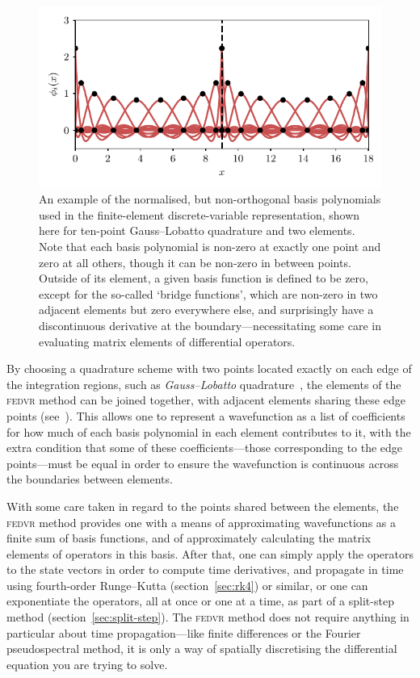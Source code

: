 \begin{figure}[t]
    \centerfloat
    \includegraphics{figures/numerics/fedvr_basis.pdf}
    \caption{An example of the normalised, but non-orthogonal basis polynomials used in the finite-element discrete-variable representation, shown here for ten-point Gauss--Lobatto quadrature and two elements. Note that each basis polynomial is non-zero at exactly one point and zero at all others, though it can be non-zero in between points. Outside of its element, a given basis function is defined to be zero, except for the so-called `bridge functions', which are non-zero in two adjacent elements but zero everywhere else, and surprisingly have a discontinuous derivative at the boundary---necessitating some care in evaluating matrix elements of differential operators.}
    \label{fig:fedvr_basis}
\end{figure}

By choosing a quadrature scheme with two points located exactly on each edge of the integration regions, such as \emph{Gauss--Lobatto} quadrature~\cite{schneider_discrete_2005}, the elements of the \textsc{fedvr} method can be joined together, with adjacent elements sharing these edge points (see~). This allows one to represent a wavefunction as a list of coefficients for how much of each basis polynomial in each element contributes to it, with the extra condition that some of these coefficients---those corresponding to the edge points---must be equal in order to ensure the wavefunction is continuous across the boundaries between elements.

With some care taken in regard to the points shared between the elements, the \textsc{fedvr} method provides one with a means of approximating wavefunctions as a finite sum of basis functions, and of approximately calculating the matrix elements of operators in this basis. After that, one can simply apply the operators to the state vectors in order to compute time derivatives, and propagate in time using fourth-order Runge--Kutta (section~\ref{sec:rk4}) or similar, or one can exponentiate the operators, all at once or one at a time, as part of a split-step method (section~\ref{sec:split-step}). The \textsc{fedvr} method does not require anything in particular about time propagation---like finite differences or the Fourier pseudospectral method, it is only a way of spatially discretising the differential equation you are trying to solve.

